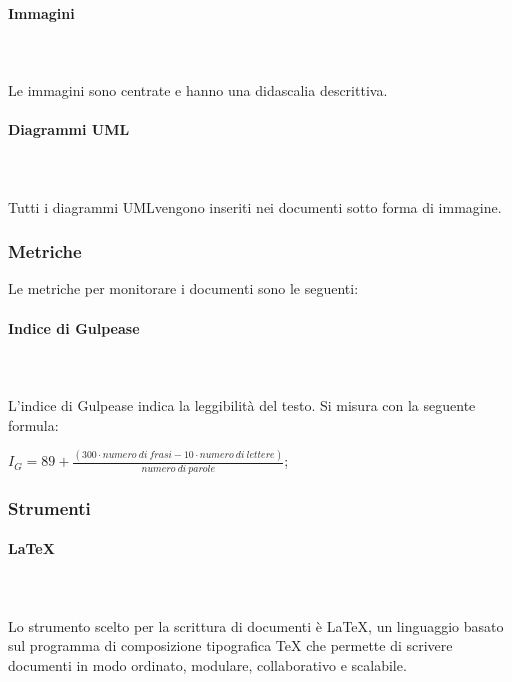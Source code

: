		\paragraph{Immagini} \mbox{}\\ \mbox{}\\
		Le immagini sono centrate e hanno una didascalia descrittiva. 
		\paragraph{Diagrammi UML} \mbox{}\\ \mbox{}\\
		Tutti i diagrammi UML\glosp vengono inseriti nei documenti sotto forma di immagine.
		\subsubsection{Metriche}
		Le metriche per monitorare i documenti sono le seguenti:
		\paragraph{Indice di Gulpease}\mbox{}\\ \mbox{}\\
			L'indice di Gulpease indica la leggibilità del testo. Si misura con la seguente formula:
			\begin{center}
				$I_G = 89+ \frac{(300 \cdot numero\ di\ frasi - 10 \cdot numero\ di\ lettere)}{numero\ di\ parole}$;
			\end{center}
			
		\subsubsection{Strumenti}
			\paragraph{\LaTeX} \mbox{}\\ \mbox{}\\
			Lo strumento scelto per la scrittura di documenti è \LaTeX{}, un linguaggio basato sul programma di composizione tipografica \TeX{} che permette di scrivere documenti in modo ordinato, modulare, collaborativo e scalabile.

